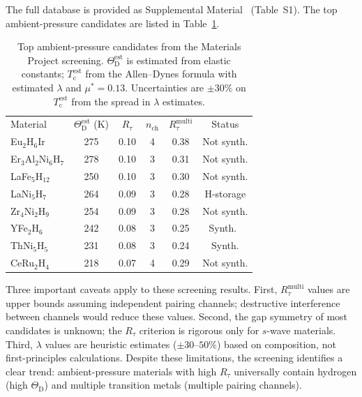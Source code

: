 \documentclass[prb,twocolumn,superscriptaddress,longbibliography,floatfix]{revtex4-2}
\newcommand{\tauasym}{\tau}
\newcommand{\Rtau}{R_{\tauasym}}
\newcommand{\Tc}{T_{\mathrm{c}}}
\newcommand{\ThetaD}{\Theta_{\mathrm{D}}}
\begin{document}
The full database is provided as Supplemental
Material~\cite{supplement} (Table~S1).  The top ambient-pressure
candidates are listed in Table~\ref{tab:mp_top}.

\begin{table}[t]
\caption{\label{tab:mp_top}Top ambient-pressure candidates
from the Materials Project screening.  $\ThetaD^{\mathrm{est}}$
is estimated from elastic constants; $\Tc^{\mathrm{est}}$ from
the Allen--Dynes formula with estimated $\lambda$ and
$\mu^* = 0.13$.  Uncertainties are $\pm 30\%$ on $\Tc^{\mathrm{est}}$
from the spread in $\lambda$ estimates.}
\begin{ruledtabular}
\begin{tabular}{lccccc}
Material & $\ThetaD^{\mathrm{est}}$ (K) & $\Rtau$ & $n_{\mathrm{ch}}$ &
$\Rtau^{\mathrm{multi}}$ & Status \\
\colrule
Eu$_2$H$_6$Ir & 275 & 0.10 & 4 & 0.38 & Not synth. \\
Er$_3$Al$_2$Ni$_6$H$_7$ & 278 & 0.10 & 3 & 0.31 & Not synth. \\
LaFe$_5$H$_{12}$ & 250 & 0.10 & 3 & 0.30 & Not synth. \\
LaNi$_5$H$_7$ & 264 & 0.09 & 3 & 0.28 & H-storage \\
Zr$_4$Ni$_2$H$_9$ & 254 & 0.09 & 3 & 0.28 & Not synth. \\
YFe$_2$H$_6$ & 242 & 0.08 & 3 & 0.25 & Synth.~\cite{Paul-Boncour2004} \\
ThNi$_5$H$_5$ & 231 & 0.08 & 3 & 0.24 & Synth. \\
CeRu$_2$H$_4$ & 218 & 0.07 & 4 & 0.29 & Not synth. \\
\end{tabular}
\end{ruledtabular}
\end{table}

Three important caveats apply to these screening results.
First, $\Rtau^{\mathrm{multi}}$ values are upper bounds assuming
independent pairing channels; destructive interference between
channels would reduce these values.  Second, the gap symmetry of
most candidates is unknown; the $\Rtau$ criterion is rigorous only
for $s$-wave materials.  Third, $\lambda$ values are heuristic
estimates ($\pm 30$--$50\%$) based on composition, not
first-principles calculations.  Despite these limitations, the
screening identifies a clear trend: ambient-pressure materials
with high $\Rtau$ universally contain hydrogen (high $\ThetaD$)
and multiple transition metals (multiple pairing channels).
\end{document}
